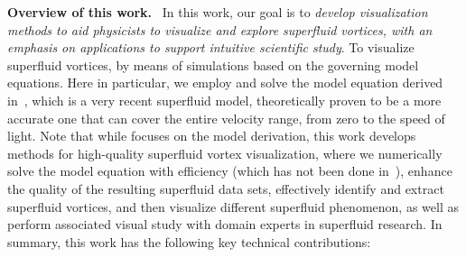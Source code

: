 \documentclass[10pt,journal,compsoc,twoside]{IEEEtran}
\newcommand{\rd}[1]{{\color[rgb]{0.0,0.0,0.0}{#1}}}
\begin{document}
	\vspace*{1.5mm}
	\noindent
	{\bf Overview of this work.} \
	In this work, our goal is to {\em develop visualization methods to aid physicists to visualize and explore superfluid vortices, with an emphasis on applications to support intuitive scientific study}.
	To visualize superfluid vortices, \rd{data sets need to be first prepared typically} by means of simulations based on the governing model equations. Here in particular, we employ and solve the model equation derived in~\cite{PRD_14}, which is a very recent superfluid model, theoretically proven to be a more accurate one that can cover the entire velocity range, from zero to the speed of light.
	Note that while \cite{PRD_14} focuses on the model derivation, this work develops methods for high-quality superfluid vortex visualization, where we numerically solve the model equation with efficiency (which has not been done in~\cite{PRD_14}), enhance the quality of the resulting superfluid data sets, effectively identify and extract superfluid vortices, and then visualize different superfluid phenomenon, as well as perform associated visual study with domain experts in superfluid research.
	In summary, this work has the following key technical contributions:
\end{document}
